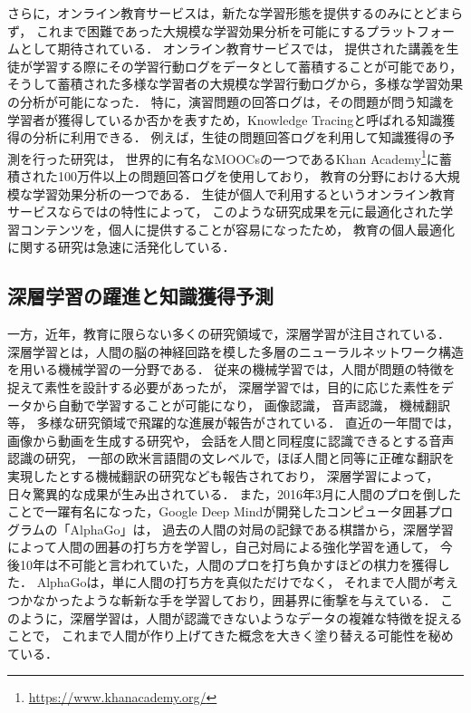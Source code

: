 

さらに，オンライン教育サービスは，新たな学習形態を提供するのみにとどまらず，
これまで困難であった大規模な学習効果分析を可能にするプラットフォームとして期待されている．
オンライン教育サービスでは，
提供された講義を生徒が学習する際にその学習行動ログをデータとして蓄積することが可能であり，
そうして蓄積された多様な学習者の大規模な学習行動ログから，多様な学習効果の分析が可能になった．
特に，演習問題の回答ログは，その問題が問う知識を学習者が獲得しているか否かを表すため，Knowledge Tracingと呼ばれる知識獲得の分析に利用できる\cite{corbett1994knowledge}．
例えば，生徒の問題回答ログを利用して知識獲得の予測を行った研究\cite{machardy2015toward}は，
世界的に有名なMOOCsの一つであるKhan Academy\footnote{\url{https://www.khanacademy.org/}}に蓄積された100万件以上の問題回答ログを使用しており，
教育の分野における大規模な学習効果分析の一つである．
生徒が個人で利用するというオンライン教育サービスならではの特性によって，
このような研究成果を元に最適化された学習コンテンツを，個人に提供することが容易になったため，
教育の個人最適化に関する研究は急速に活発化している．


\subsection{深層学習の躍進と知識獲得予測}
一方，近年，教育に限らない多くの研究領域で，深層学習が注目されている．
深層学習とは，人間の脳の神経回路を模した多層のニューラルネットワーク構造を用いる機械学習の一分野である．
従来の機械学習では，人間が問題の特徴を捉えて素性を設計する必要があったが，
深層学習では，目的に応じた素性をデータから自動で学習することが可能になり，
画像認識\cite{schroff2015facenet,szegedy2014going}，
音声認識\cite{hinton2012deep, bahdanau2015end}，
機械翻訳\cite{sutskever2014sequence, dong2015multi}等，
多様な研究領域で飛躍的な進展が報告がされている．
直近の一年間では，
画像から動画を生成する研究\cite{vondrick2016generating}や，
会話を人間と同程度に認識できるとする音声認識の研究\cite{xiong2016achieving}，
一部の欧米言語間の文レベルで，ほぼ人間と同等に正確な翻訳を実現したとする機械翻訳の研究\cite{wu2016google}なども報告されており，
深層学習によって，日々驚異的な成果が生み出されている．
また，2016年3月に人間のプロを倒したことで一躍有名になった，Google Deep Mindが開発したコンピュータ囲碁プログラムの「AlphaGo」\cite{silver2016mastering}は，
過去の人間の対局の記録である棋譜から，深層学習によって人間の囲碁の打ち方を学習し，自己対局による強化学習を通して，
今後10年は不可能と言われていた，人間のプロを打ち負かすほどの棋力を獲得した．
AlphaGoは，単に人間の打ち方を真似ただけでなく，
それまで人間が考えつかなかったような斬新な手を学習しており，囲碁界に衝撃を与えている．
このように，深層学習は，人間が認識できないようなデータの複雑な特徴を捉えることで，
これまで人間が作り上げてきた概念を大きく塗り替える可能性を秘めている．



